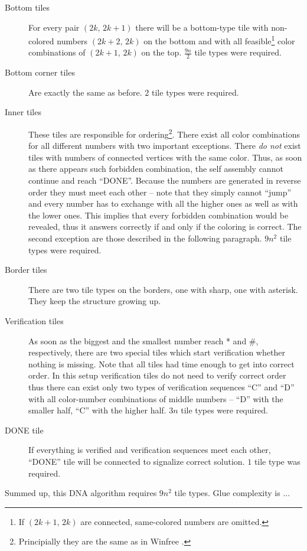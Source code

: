 \begin{description}
	\item[Bottom tiles] For every pair $(2k,\,2k+1)$ there will be a bottom-type tile with non-colored numbers $(2k+2,\,2k)$ on the bottom and with all feasible\footnote{If $(2k+1,\,2k)$ are connected, same-colored numbers are omitted.} color combinations of $(2k+1,\,2k)$ on the top. $\frac{9n}{2}$ tile types were required.
	\item[Bottom corner tiles] Are exactly the same as before. $2$ tile types were required.
	\item[Inner tiles] These tiles are responsible for ordering\footnote{Principially they are the same as in Winfree \cite{winfree_phd}.}. There exist all color combinations for all different numbers with two important exceptions. There {\em do not} exist tiles with numbers of connected vertices with the same color. Thus, as soon as there appears such forbidden combination, the self assembly cannot continue and reach ``DONE''. Because the numbers are generated in reverse order they must meet each other -- note that they simply cannot ``jump'' and every number has to exchange with all the higher ones as well as with the lower ones. This implies that every forbidden combination would be revealed, thus it answers correctly if and only if the coloring is correct. The second exception are those described in the following paragraph. $9n^2$ tile types were required.
	\item[Border tiles] There are two tile types on the borders, one with sharp, one with asterisk. They keep the structure growing up.
	\item[Verification tiles] As soon as the biggest and the smallest number reach * and \#, respectively, there are two special tiles which start verification whether nothing is missing. Note that all tiles had time enough to get into correct order. In this setup verification tiles do not need to verify correct order thus there can exist only two types of verification sequences ``C'' and ``D'' with all color-number combinations of middle numbers -- ``D'' with the smaller half, ``C'' with the higher half. $3n$ tile types were required.
	\item[DONE tile] If everything is verified and verification sequences meet each other, ``DONE'' tile will be connected to signalize correct solution. $1$ tile type was required.
\end{description}
Summed up, this DNA algorithm requires $9n^2$ tile types. Glue complexity is ...

